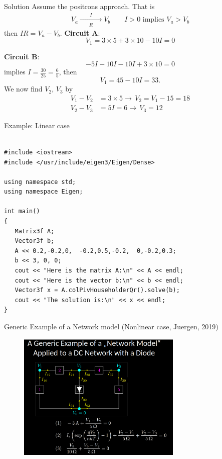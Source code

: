 \documentclass[xcolor=dvipsnames]{beamer}
\begin{document}
\begin{frame}{Solution}
Assume the positrons approach. That is
\begin{align*}
V_a	\xrightarrow[R]{\qquad I \qquad} V_b \qquad I>0\,\,\text{implies}\,\,V_a>V_b
\end{align*}
then $IR=V_a-V_b.$
	\textbf{Circuit A}:
\[	V_1 = 3\times 5 + 3\times 10 -10 I =0 \]

	\textbf{Circuit B}:
\[	-5I - 10 I -10 I +3\times 10 =0 \]
implies $I=\frac{30}{25}=\frac{6}{5}$, then
\[V_1 = 45 - 10I=33.\]
We now find $V_2$, $V_3$ by 
\begin{align*}
	V_1 - V_2 &= 3\times 5 \rightarrow\, V_2 = V_1 - 15 = 18\\
	V_2 - V_3 &= 5I = 6 \rightarrow\, V_3 = 12
\end{align*}
\end{frame}


\begin{frame}[fragile,shrink=30]{Example: Linear case}
\begin{verbatim}

#include <iostream>
#include </usr/include/eigen3/Eigen/Dense>
 
using namespace std;
using namespace Eigen;
 
int main()
{
   Matrix3f A;
   Vector3f b;
   A << 0.2,-0.2,0,  -0.2,0.5,-0.2,  0,-0.2,0.3;
   b << 3, 0, 0;
   cout << "Here is the matrix A:\n" << A << endl;
   cout << "Here is the vector b:\n" << b << endl;
   Vector3f x = A.colPivHouseholderQr().solve(b);
   cout << "The solution is:\n" << x << endl;
}
\end{verbatim}
\end{frame}

\begin{frame}{Generic Example of a Network model (Nonlinear case, Juergen, 2019)}
     	     \begin{figure}[!ht]
  			\centering
    		\includegraphics[width=0.7\textwidth]{diode.png}
    		\label{fig:juergen2}
    	 \end{figure}
\end{frame}
\end{document}
